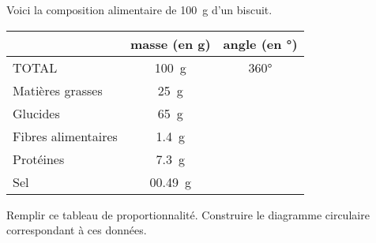 \documentclass[../Cours.tex]{subfiles}
\begin{document}
\clearpage
\EXERCICES 
\begin{questions}
    \exercice 
    Voici la composition alimentaire de \qty{100}{\gram} d'un biscuit.

    \begin{center}
        \begin{tabularx}{0.6\linewidth}{|l|C|C|}\hline
            & masse (en \unit{\gram}) & angle (en \unit{°}) \\\hline
            TOTAL & \qty{100}{\gram} & \ang{360} \\ \hline \hline 
            Matières grasses & \qty{25}{\gram} & \\\hline
            Glucides & \qty{65}{\gram} & \\\hline
            Fibres alimentaires & \qty{1.4}{\gram} & \\\hline
            Protéines & \qty{7.3}{\gram} & \\\hline
            Sel & \qty{0    .49}{\gram} & \\\hline
        \end{tabularx}
    \end{center}

    \question Remplir ce tableau de proportionnalité.
    \question Construire le diagramme circulaire correspondant à ces données.
\end{questions}
\end{document}
